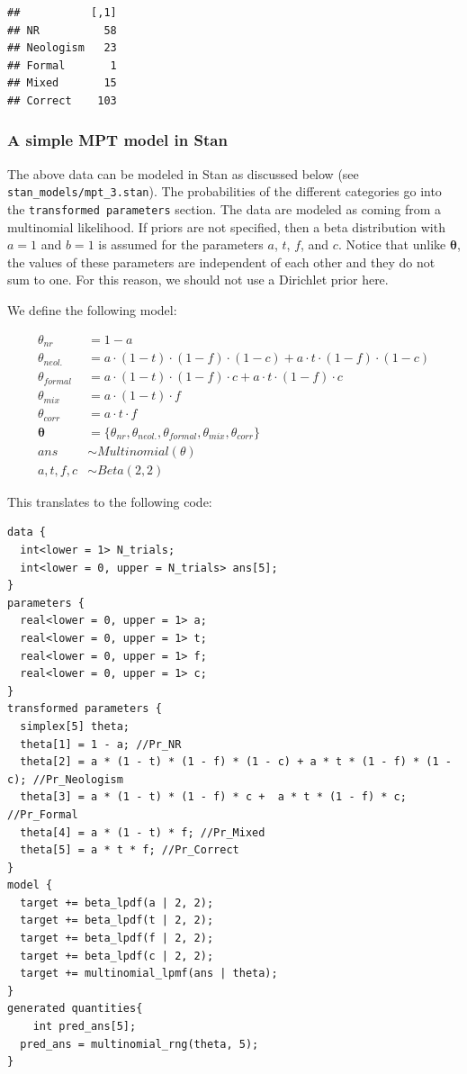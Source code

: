 \documentclass[12pt,]{krantz}
\theoremstyle{definition}
\theoremstyle{definition}
\theoremstyle{definition}
\theoremstyle{remark}
\begin{document}
\begin{verbatim}
##           [,1]
## NR          58
## Neologism   23
## Formal       1
## Mixed       15
## Correct    103
\end{verbatim}

\subsubsection{A simple MPT model in Stan}\label{sec:MPT-s}

The above data can be modeled in Stan as discussed below (see
\texttt{stan\_models/mpt\_3.stan}). The probabilities of the different
categories go into the \texttt{transformed\ parameters} section. The
data are modeled as coming from a multinomial likelihood. If priors are
not specified, then a beta distribution with \(a=1\) and \(b=1\) is
assumed for the parameters \(a\), \(t\), \(f\), and \(c\). Notice that
unlike \(\boldsymbol{\theta}\), the values of these parameters are
independent of each other and they do not sum to one. For this reason,
we should not use a Dirichlet prior here.

We define the following model:

\begin{equation}
\begin{aligned}
\theta_{nr} &= 1-a \\
\theta_{neol.} &= a \cdot (1-t) \cdot (1-f) \cdot (1-c) +  a \cdot t \cdot (1-f) \cdot (1-c)\\
\theta_{formal} &= a \cdot (1-t) \cdot (1-f) \cdot c +  a \cdot t \cdot (1-f) \cdot c\\
\theta_{mix} &= a \cdot (1-t) \cdot f\\
\theta_{corr} &= a \cdot t \cdot f\\
\boldsymbol{\theta} &= \{\theta_{nr}, \theta_{neol.}, \theta_{formal}, \theta_{mix}, \theta_{corr}\}\\
ans &\sim Multinomial(\theta)\\
a,t,f,c &\sim Beta(2, 2)
\end{aligned}
\end{equation}

This translates to the following code:

\begin{verbatim}
data { 
  int<lower = 1> N_trials;
  int<lower = 0, upper = N_trials> ans[5];
}
parameters {
  real<lower = 0, upper = 1> a;
  real<lower = 0, upper = 1> t;
  real<lower = 0, upper = 1> f;
  real<lower = 0, upper = 1> c;
} 
transformed parameters {
  simplex[5] theta;
  theta[1] = 1 - a; //Pr_NR
  theta[2] = a * (1 - t) * (1 - f) * (1 - c) + a * t * (1 - f) * (1 - c); //Pr_Neologism
  theta[3] = a * (1 - t) * (1 - f) * c +  a * t * (1 - f) * c;  //Pr_Formal
  theta[4] = a * (1 - t) * f; //Pr_Mixed
  theta[5] = a * t * f; //Pr_Correct
}
model {
  target += beta_lpdf(a | 2, 2);
  target += beta_lpdf(t | 2, 2);
  target += beta_lpdf(f | 2, 2);
  target += beta_lpdf(c | 2, 2);
  target += multinomial_lpmf(ans | theta);
}
generated quantities{
    int pred_ans[5];
  pred_ans = multinomial_rng(theta, 5);
}
\end{verbatim}
\end{document}
